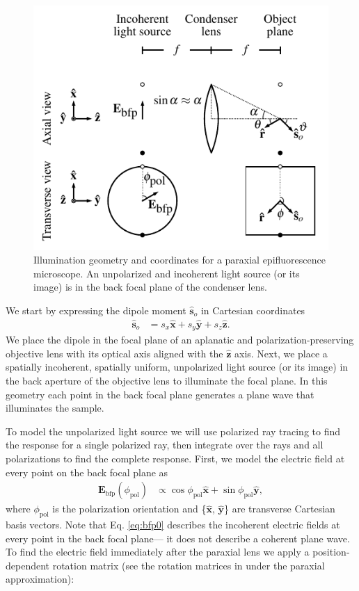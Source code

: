 \documentclass[]{osa-article}
\providecommand{\mb}[1]{\mathbf{#1}}
\providecommand{\so}{\mathbf{\hat{s}}_o}
\providecommand{\mh}[1]{\mathbf{\hat{#1}}}
\begin{document}
\begin{figure}[h]
 \centering
   \centering
   \includegraphics[scale=.9]{../figures/excitation-coords/excitation-coords.pdf}
   \caption{Illumination geometry and coordinates for a paraxial epifluorescence
     microscope. An unpolarized and incoherent light source (or its image) is in
     the back focal plane of the condenser lens.}
   \label{fig:exccoords}
 \end{figure}

We start by expressing the dipole moment $\so{}$ in Cartesian coordinates
\begin{align}
  \so{} &= s_x\mh{x} + s_y\mh{y} + s_z\mh{z}. \label{eq:spherical}
\end{align}
We place the dipole in the focal plane of an aplanatic and
polarization-preserving objective lens with its optical axis aligned with the
$\mh{z}$ axis. Next, we place a spatially incoherent, spatially uniform,
unpolarized light source (or its image) in the back aperture of the objective
lens to illuminate the focal plane. In this geometry each point in the back
focal plane generates a plane wave that illuminates the sample.

To model the unpolarized light source we will use polarized ray tracing
\cite{foreman2011} to find the response for a single polarized ray, then
integrate over the rays and all polarizations to find the complete response.
First, we model the electric field at every point on the back focal plane as
\begin{align}
   \mb{E}_{\text{bfp}}(\phi_{\text{pol}}) &\propto \cos\phi_{\text{pol}}\mh{x} + \sin\phi_{\text{pol}}\mh{y}, \label{eq:bfp0}
\end{align}
where $\phi_{\text{pol}}$ is the polarization orientation and \{$\mh{x}$,
$\mh{y}$\} are transverse Cartesian basis vectors. Note that Eq. \ref{eq:bfp0}
describes the incoherent electric fields at every point in the back focal
plane--- it does not describe a coherent plane wave. To find the electric field
immediately after the paraxial lens we apply a position-dependent rotation
matrix (see the rotation matrices in \cite{foreman2011, backer2014} under the
paraxial approximation):
\end{document}
